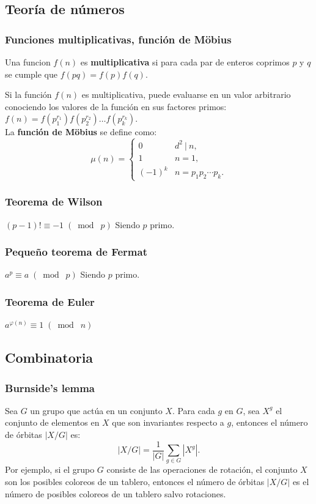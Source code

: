 \subsection{Teoría de números}
{
\subsubsection{Funciones multiplicativas, función de Möbius}
{
Una funcion $f(n)$ es \textbf{multiplicativa} si para cada par de enteros coprimos $p$ y $q$ se cumple que \(f(pq) = f(p)f(q)\).

Si la función $f(n)$ es multiplicativa, puede evaluarse en un valor arbitrario conociendo los valores de la función en
sus factores primos: \(f(n) = f(p_1^{r_1})f(p_2^{r_2})\ldots f(p_k^{r_k})\).\\

La \textbf{función de Möbius} se define como:
\[\mu(n) = \begin{cases} 0 & d^2\ |\ n, \\ 1 & n=1,\\ (-1)^k & n = p_1p_2\cdots{p_k} .\end{cases}\]

\subsubsection{Teorema de Wilson}
{
\(\displaystyle (p-1)! \equiv -1 \;(\bmod\; p) \)
Siendo $p$ primo.
}
\subsubsection{Pequeño teorema de Fermat}
{
\(\displaystyle a^p \equiv a \;(\bmod\; p) \)
Siendo $p$ primo.
}
\subsubsection{Teorema de Euler}
{
\(\displaystyle a^{\varphi(n)} \equiv 1 \;(\bmod\; n) \)
}
}
\subsection{Combinatoria}
{
\subsubsection{Burnside's lemma}
{
Sea $G$ un grupo que actúa en un conjunto $X$. Para cada $g$ en $G$, sea $X^{g}$ el conjunto de elementos
en $X$ que son invariantes respecto a $g$, entonces el número de órbitas $|X/G|$ es:
\[ |X/G|={\frac {1}{|G|}}\sum _{{g\in G}}|X^{g}|.\]
Por ejemplo, si el grupo $G$ consiste de las operaciones de rotación, el conjunto $X$ son los posibles coloreos de un tablero, 
entonces el número de órbitas $|X/G|$ es el número de posibles coloreos de un tablero salvo rotaciones.
}

}}
